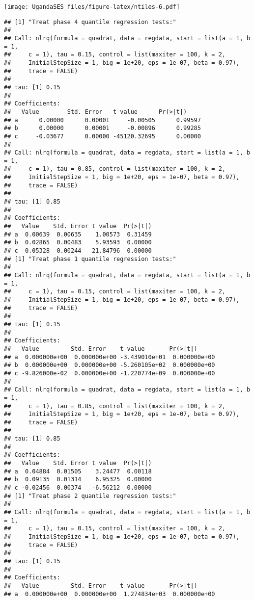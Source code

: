 \documentclass[
]{article}
\begin{document}
\texttt{[image: UgandaSES\_files/figure-latex/ntiles-6.pdf]}

\begin{verbatim}
## [1] "Treat phase 4 quantile regression tests:"
## 
## Call: nlrq(formula = quadrat, data = regdata, start = list(a = 1, b = 1, 
##     c = 1), tau = 0.15, control = list(maxiter = 100, k = 2, 
##     InitialStepSize = 1, big = 1e+20, eps = 1e-07, beta = 0.97), 
##     trace = FALSE)
## 
## tau: [1] 0.15
## 
## Coefficients:
##   Value        Std. Error   t value      Pr(>|t|)    
## a      0.00000      0.00001     -0.00505      0.99597
## b      0.00000      0.00001     -0.00896      0.99285
## c     -0.03677      0.00000 -45120.32695      0.00000
## 
## Call: nlrq(formula = quadrat, data = regdata, start = list(a = 1, b = 1, 
##     c = 1), tau = 0.85, control = list(maxiter = 100, k = 2, 
##     InitialStepSize = 1, big = 1e+20, eps = 1e-07, beta = 0.97), 
##     trace = FALSE)
## 
## tau: [1] 0.85
## 
## Coefficients:
##   Value    Std. Error t value  Pr(>|t|)
## a  0.00639  0.00635    1.00573  0.31459
## b  0.02865  0.00483    5.93593  0.00000
## c  0.05328  0.00244   21.84796  0.00000
## [1] "Treat phase 1 quantile regression tests:"
## 
## Call: nlrq(formula = quadrat, data = regdata, start = list(a = 1, b = 1, 
##     c = 1), tau = 0.15, control = list(maxiter = 100, k = 2, 
##     InitialStepSize = 1, big = 1e+20, eps = 1e-07, beta = 0.97), 
##     trace = FALSE)
## 
## tau: [1] 0.15
## 
## Coefficients:
##   Value         Std. Error    t value       Pr(>|t|)     
## a  0.000000e+00  0.000000e+00 -3.439010e+01  0.000000e+00
## b  0.000000e+00  0.000000e+00 -5.260105e+02  0.000000e+00
## c -9.826000e-02  0.000000e+00 -1.220774e+09  0.000000e+00
## 
## Call: nlrq(formula = quadrat, data = regdata, start = list(a = 1, b = 1, 
##     c = 1), tau = 0.85, control = list(maxiter = 100, k = 2, 
##     InitialStepSize = 1, big = 1e+20, eps = 1e-07, beta = 0.97), 
##     trace = FALSE)
## 
## tau: [1] 0.85
## 
## Coefficients:
##   Value    Std. Error t value  Pr(>|t|)
## a  0.04884  0.01505    3.24477  0.00118
## b  0.09135  0.01314    6.95325  0.00000
## c -0.02456  0.00374   -6.56212  0.00000
## [1] "Treat phase 2 quantile regression tests:"
## 
## Call: nlrq(formula = quadrat, data = regdata, start = list(a = 1, b = 1, 
##     c = 1), tau = 0.15, control = list(maxiter = 100, k = 2, 
##     InitialStepSize = 1, big = 1e+20, eps = 1e-07, beta = 0.97), 
##     trace = FALSE)
## 
## tau: [1] 0.15
## 
## Coefficients:
##   Value         Std. Error    t value       Pr(>|t|)     
## a  0.000000e+00  0.000000e+00  1.274834e+03  0.000000e+00

\end{verbatim}
\end{document}
